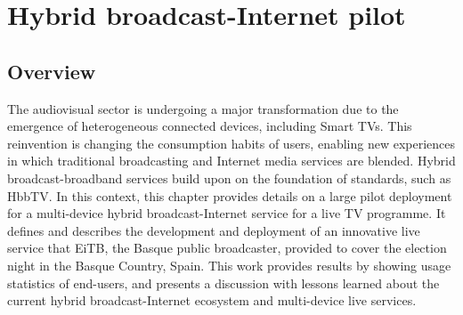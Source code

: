 \chapter{Hybrid broadcast-Internet pilot}
\label{chap:deployment}

\section{Overview}


The audiovisual sector is undergoing a major transformation due to the emergence of heterogeneous connected devices, including Smart TVs. This reinvention is changing the consumption habits of users, enabling new experiences in which traditional broadcasting and Internet media services are blended. Hybrid broadcast-broadband services build upon on the foundation of standards, such as HbbTV. In this context, this chapter provides details on a large pilot deployment for a multi-device hybrid broadcast-Internet service for a live TV programme. It defines and describes the development and deployment of an innovative live service that EiTB, the Basque public broadcaster, provided to cover the election night in the Basque Country, Spain. This work provides results by showing usage statistics of end-users, and presents a discussion with lessons learned about the current hybrid broadcast-Internet ecosystem and multi-device live services.
%


